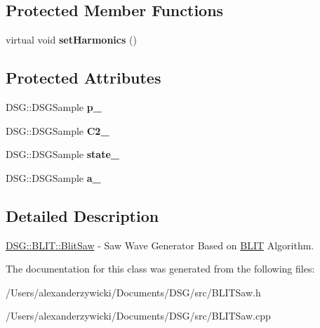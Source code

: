 \subsection*{Protected Member Functions}
\begin{DoxyCompactItemize}
\item 
\hypertarget{class_d_s_g_1_1_b_l_i_t_1_1_blit_saw_ade1e22123e7b9cbb1eb4c954cb2759fa}{virtual void {\bfseries set\+Harmonics} ()}\label{class_d_s_g_1_1_b_l_i_t_1_1_blit_saw_ade1e22123e7b9cbb1eb4c954cb2759fa}

\end{DoxyCompactItemize}
\subsection*{Protected Attributes}
\begin{DoxyCompactItemize}
\item 
\hypertarget{class_d_s_g_1_1_b_l_i_t_1_1_blit_saw_a9be6886742b7b3e263611cf9dd6a9c69}{D\+S\+G\+::\+D\+S\+G\+Sample {\bfseries p\+\_\+}}\label{class_d_s_g_1_1_b_l_i_t_1_1_blit_saw_a9be6886742b7b3e263611cf9dd6a9c69}

\item 
\hypertarget{class_d_s_g_1_1_b_l_i_t_1_1_blit_saw_a39ff301ab1f690c070b2045d4a2c40bf}{D\+S\+G\+::\+D\+S\+G\+Sample {\bfseries C2\+\_\+}}\label{class_d_s_g_1_1_b_l_i_t_1_1_blit_saw_a39ff301ab1f690c070b2045d4a2c40bf}

\item 
\hypertarget{class_d_s_g_1_1_b_l_i_t_1_1_blit_saw_a96ed0fbd2aded5f27a634d2154eb25bb}{D\+S\+G\+::\+D\+S\+G\+Sample {\bfseries state\+\_\+}}\label{class_d_s_g_1_1_b_l_i_t_1_1_blit_saw_a96ed0fbd2aded5f27a634d2154eb25bb}

\item 
\hypertarget{class_d_s_g_1_1_b_l_i_t_1_1_blit_saw_ae08abf583330659efe328a1771367f23}{D\+S\+G\+::\+D\+S\+G\+Sample {\bfseries a\+\_\+}}\label{class_d_s_g_1_1_b_l_i_t_1_1_blit_saw_ae08abf583330659efe328a1771367f23}

\end{DoxyCompactItemize}


\subsection{Detailed Description}
\hyperlink{class_d_s_g_1_1_b_l_i_t_1_1_blit_saw}{D\+S\+G\+::\+B\+L\+I\+T\+::\+Blit\+Saw} -\/ Saw Wave Generator Based on \hyperlink{namespace_d_s_g_1_1_b_l_i_t}{B\+L\+I\+T} Algorithm. 

The documentation for this class was generated from the following files\+:\begin{DoxyCompactItemize}
\item 
/\+Users/alexanderzywicki/\+Documents/\+D\+S\+G/src/B\+L\+I\+T\+Saw.\+h\item 
/\+Users/alexanderzywicki/\+Documents/\+D\+S\+G/src/B\+L\+I\+T\+Saw.\+cpp\end{DoxyCompactItemize}
